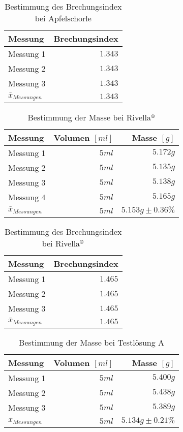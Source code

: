 \documentclass[a4paper]{article}
\newcommand{\superscript}[1]{\ensuremath{^{\textrm{#1}}}}
\begin{document}
\begin{table}[H]
\caption{Bestimmung des Brechungsindex bei Apfelschorle}
\centering
\begin{tabular}{lr}
\toprule
Messung & Brechungsindex \\
\midrule
Messung 1 & \(1.343\) \\
Messung 2 & \(1.343\) \\
Messung 3 & \(1.343\) \\
\midrule
$\bar{x}_{Messungen}$ & \(1.343\) \\
\bottomrule
\end{tabular}
\end{table}


\begin{table}[H]
\caption{Bestimmung der Masse bei Rivella\superscript{\textregistered}}
\centering
\begin{tabular}{lrr}
\toprule
Messung & Volumen \([ml]\) & Masse \([g]\)\\
\midrule
Messung 1 & \(5ml\) & \(5.172g\) \\
Messung 2 & \(5ml\) & \(5.135g\) \\
Messung 3 & \(5ml\) & \(5.138g\) \\
Messung 4 & \(5ml\) & \(5.165g\) \\
\midrule
$\bar{x}_{Messungen}$ & \(5ml\) & \(5.153g \pm 0.36\%\) \\
\bottomrule
\end{tabular}
\end{table}

\begin{table}[H]
\caption{Bestimmung des Brechungsindex bei Rivella\superscript{\textregistered}}
\centering
\begin{tabular}{lr}
\toprule
Messung & Brechungsindex \\
\midrule
Messung 1 & \(1.465\) \\
Messung 2 & \(1.465\) \\
Messung 3 & \(1.465\) \\
\midrule
$\bar{x}_{Messungen}$ & \(1.465\) \\
\bottomrule
\end{tabular}
\end{table}


\begin{table}[H]
\caption{Bestimmung der Masse bei Testlösung A}
\centering
\begin{tabular}{lrr}
\toprule
Messung & Volumen \([ml]\) & Masse \([g]\)\\
\midrule
Messung 1 & \(5ml\) & \(5.400g\) \\
Messung 2 & \(5ml\) & \(5.438g\) \\
Messung 3 & \(5ml\) & \(5.389g\) \\
\midrule
$\bar{x}_{Messungen}$ & \(5ml\) & \(5.134g \pm 0.21\%\) \\
\bottomrule
\end{tabular}
\end{table}
\end{document}
